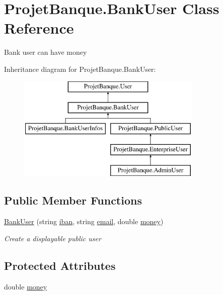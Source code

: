 \hypertarget{class_projet_banque_1_1_bank_user}{}\section{Projet\+Banque.\+Bank\+User Class Reference}
\label{class_projet_banque_1_1_bank_user}


Bank user can have money  


Inheritance diagram for Projet\+Banque.\+Bank\+User\+:\begin{figure}[H]
\begin{center}
\leavevmode
\includegraphics[height=5.000000cm]{class_projet_banque_1_1_bank_user}
\end{center}
\end{figure}
\subsection*{Public Member Functions}
\begin{DoxyCompactItemize}
\item 
\mbox{\hyperlink{class_projet_banque_1_1_bank_user_a71bbea3dd3db42f9ae11b67338d47f48}{Bank\+User}} (string \mbox{\hyperlink{class_projet_banque_1_1_user_a52d4f7f22889d33e196357127ceb3ec3}{iban}}, string \mbox{\hyperlink{class_projet_banque_1_1_user_a7ee066f61ff3a59b05f003709548428a}{email}}, double \mbox{\hyperlink{class_projet_banque_1_1_bank_user_a070a143e326a9bec28b4123a8e0e7d8f}{money}})
\begin{DoxyCompactList}\small\item\em Create a displayable public user \end{DoxyCompactList}\end{DoxyCompactItemize}
\subsection*{Protected Attributes}
\begin{DoxyCompactItemize}
\item 
double \mbox{\hyperlink{class_projet_banque_1_1_bank_user_a070a143e326a9bec28b4123a8e0e7d8f}{money}}
\end{DoxyCompactItemize}
